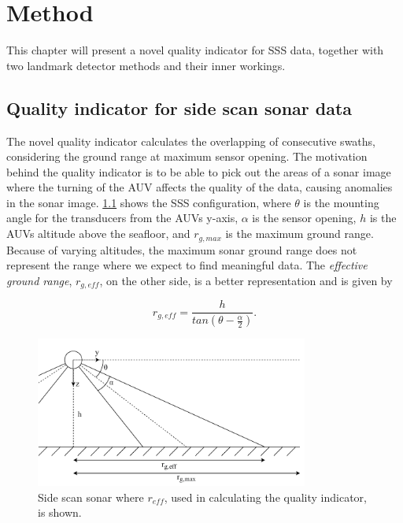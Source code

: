 \chapter{Method}

This chapter will present a novel quality indicator for SSS data, together with two landmark detector methods and their inner workings. 

\section{Quality indicator for side scan sonar data}

The novel quality indicator calculates the overlapping of consecutive swaths, considering the ground range at maximum sensor opening. The motivation behind the quality indicator is to be able to pick out the areas of a sonar image where the turning of the AUV affects the quality of the data, causing anomalies in the sonar image. \cref{fig:r_eff} shows the SSS configuration, where $\theta$ is the mounting angle for the transducers from the AUVs y-axis, $\alpha$ is the sensor opening, $h$ is the AUVs altitude above the seafloor, and $r_{g, max}$ is the maximum ground range. Because of varying altitudes, the maximum sonar ground range does not represent the range where we expect to find meaningful data. The \textit{effective ground range}, $r_{g, eff}$, on the other side, is a better representation and is given by

\begin{equation}
    r_{g,eff} = \frac{h}{tan(\theta - \frac{\alpha}{2})}.
    \label{eq:r_g_eff}
\end{equation}

\begin{figure}
    \centering
    \includegraphics[width=0.8\textwidth]{figures/r_eff.drawio.pdf}
    \caption{Side scan sonar where $r_{eff}$, used in calculating the quality indicator, is shown.}
    \label{fig:r_eff}
\end{figure}

